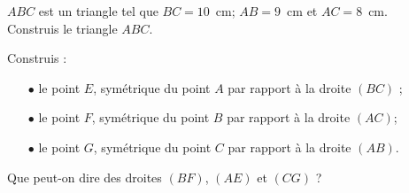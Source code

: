 \begin{myenumerate}
\item $ABC$ est un triangle tel que $BC=10$~cm; $AB=9$~cm et
$AC=8$~cm.\\Construis le triangle $ABC$.
\item Construis :
\begin{itemize}
\item[$\bullet$] le point $E$, symétrique du point $A$ par rapport à
la droite $(BC)$ ;
\item[$\bullet$] le point $F$, symétrique du point $B$ par rapport à
la droite $(AC)$;
\item[$\bullet$] le point $G$, symétrique du point $C$ par rapport à
la droite $(AB)$.
\end{itemize}
\item Que peut-on dire des droites $(BF)$, $(AE)$ et $(CG)$ ?
\end{myenumerate}
